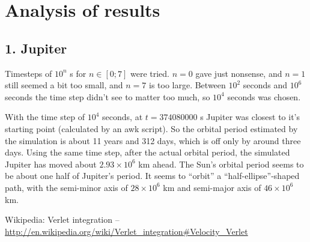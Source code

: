 \documentclass[a4paper]{article}
\begin{document}
   \section{Analysis of results}
   \subsection{1. Jupiter}
   Timesteps of $10^n$ s for $n \in [0; 7]$ were tried. $n = 0$ gave just nonsense, and $n = 1$ still seemed a bit too small, and $n = 7$ is too large.
   Between $10^2$ seconds and $10^6$ seconds the time step didn't see to matter too much, so $10^4$ seconds was chosen.

   With the time step of $10^4$ seconds, at $t = 374080000$ s Jupiter was closest to it's starting point (calculated by an awk script).
   So the orbital period estimated by the simulation is about 11 years and 312 days, which is off only by around three days.
   Using the same time step, after the actual orbital period, the simulated Jupiter has moved about $2.93 \times 10^6$ km ahead.
   The Sun's orbital period seems to be about one half of Jupiter's period.
   It seems to ``orbit'' a ``half-ellipse''-shaped path, with the semi-minor axis of $ 28 \times 10^6 $ km and semi-major axis of $ 46 \times 10^6$ km.

   \begin{thebibliography}{9}
 Wikipedia: Verlet integration -- \url{http://en.wikipedia.org/wiki/Verlet_integration#Velocity_Verlet}
\end{thebibliography}
\end{document}
